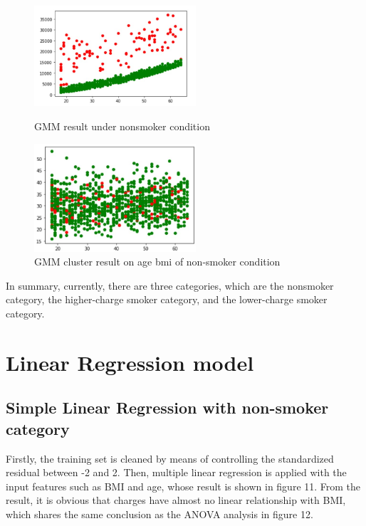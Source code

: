 \documentclass[12pt,a4paper]{article}
\begin{document}
\begin{figure}[H]
\centering
\begin{minipage}[t]{0.48\textwidth}
\centering
\includegraphics[width=6cm]{GMM RESULT with nonsmoker.jpg}
\caption{GMM result under nonsmoker condition}
\end{minipage}
\begin{minipage}[t]{0.48\textwidth}
\centering
\includegraphics[width=6cm]{SVM2.jpg}
\caption{GMM cluster result on age bmi of non-smoker condition}
\end{minipage}
\end{figure}
In summary, currently, there are three categories, which are the nonsmoker category, the higher-charge smoker category, and the lower-charge smoker category.
\section{Linear Regression model}

\subsection{Simple Linear Regression with non-smoker category}
Firstly, the training set is cleaned by means of controlling the standardized residual between -2 and 2. 
Then, multiple linear regression is applied with the input features such as BMI and age, whose result is shown in figure 11. From the result, it is obvious that charges have almost no linear relationship with BMI, which shares the same conclusion as the ANOVA analysis in figure 12. 
\end{document}
